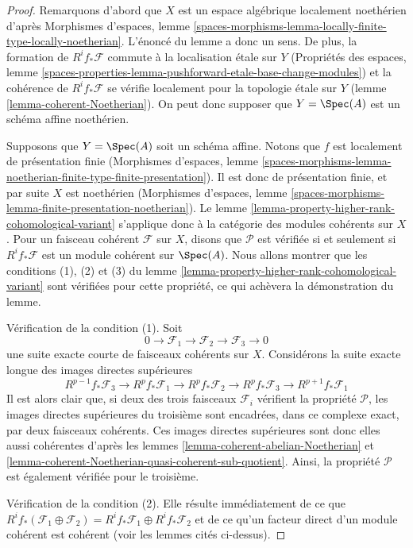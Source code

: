 \begin{proof}
Remarquons d'abord que $X$ est un espace algébrique localement noethérien
d'après Morphismes d'espaces, lemme
\ref{spaces-morphisms-lemma-locally-finite-type-locally-noetherian}.
L'énoncé du lemme a donc un sens. De plus, la formation de
$R^if_*\mathcal{F}$ commute à la localisation \'etale sur $Y$
(Propriétés des espaces, lemme
\ref{spaces-properties-lemma-pushforward-etale-base-change-modules})
et la cohérence de $R^if_*\mathcal{F}$ se vérifie
localement pour la topologie \'etale sur $Y$ (lemme \ref{lemma-coherent-Noetherian}).
On peut donc supposer que $Y = \Spec(A)$ est un schéma affine noethérien.

\medskip\noindent
Supposons que $Y = \Spec(A)$ soit un schéma affine. Notons que $f$ est localement
de présentation finie
(Morphismes d'espaces, lemme
\ref{spaces-morphisms-lemma-noetherian-finite-type-finite-presentation}).
Il est donc de présentation finie, et par suite $X$ est noethérien
(Morphismes d'espaces, lemme
\ref{spaces-morphisms-lemma-finite-presentation-noetherian}).
Le lemme \ref{lemma-property-higher-rank-cohomological-variant}
s'applique donc à la catégorie des modules cohérents sur $X$.
Pour un faisceau cohérent $\mathcal{F}$ sur $X$, disons que $\mathcal{P}$ est vérifiée
si et seulement si $R^if_*\mathcal{F}$ est un module cohérent sur $\Spec(A)$.
Nous allons montrer que les conditions (1), (2) et (3) du
lemme \ref{lemma-property-higher-rank-cohomological-variant} sont vérifiées
pour cette propriété, ce qui achèvera la démonstration du lemme.

\medskip\noindent
Vérification de la condition (1). Soit
$$
0 \to \mathcal{F}_1 \to \mathcal{F}_2 \to \mathcal{F}_3 \to 0
$$
une suite exacte courte de faisceaux cohérents sur $X$.
Considérons la suite exacte longue des images directes supérieures
$$
R^{p - 1}f_*\mathcal{F}_3 \to
R^pf_*\mathcal{F}_1 \to
R^pf_*\mathcal{F}_2 \to
R^pf_*\mathcal{F}_3 \to
R^{p + 1}f_*\mathcal{F}_1
$$
Il est alors clair que, si deux des trois faisceaux $\mathcal{F}_i$
vérifient la propriété $\mathcal{P}$, les images directes supérieures du
troisième sont encadrées, dans ce complexe exact, par deux faisceaux
cohérents. Ces images directes supérieures sont donc elles aussi cohérentes d'après les
lemmes \ref{lemma-coherent-abelian-Noetherian} et
\ref{lemma-coherent-Noetherian-quasi-coherent-sub-quotient}.
Ainsi, la propriété $\mathcal{P}$ est également vérifiée pour le troisième.

\medskip\noindent
Vérification de la condition (2). Elle résulte immédiatement de ce que
$R^if_*(\mathcal{F}_1 \oplus \mathcal{F}_2) =
R^if_*\mathcal{F}_1 \oplus R^if_*\mathcal{F}_2$ et de ce qu'un facteur direct
d'un module cohérent est cohérent (voir les lemmes cités ci-dessus).


\end{proof}

